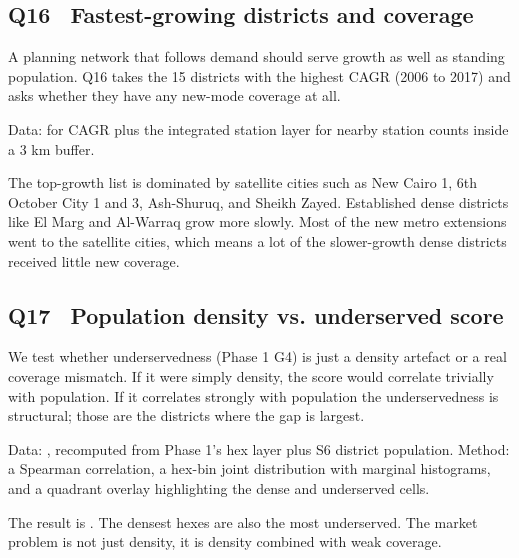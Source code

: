 \subsection{Q16 \textbullet\ Fastest-growing districts and coverage}

A planning network that follows demand should serve growth as well as
standing population. Q16 takes the 15 districts with the highest CAGR
(2006 to 2017) and asks whether they have any new-mode coverage at
all.

Data:  for CAGR plus the integrated station
layer for nearby station counts inside a 3 km buffer.


The top-growth list is dominated by satellite cities such as New Cairo
1, 6th October City 1 and 3, Ash-Shuruq, and Sheikh Zayed. Established
dense districts like El Marg and Al-Warraq grow more slowly. Most of
the new metro extensions went to the satellite cities, which means a
lot of the slower-growth dense districts received little new coverage.

\subsection{Q17 \textbullet\ Population density vs. underserved score}

We test whether underservedness (Phase 1 G4) is just a density artefact
or a real coverage mismatch. If it were simply density, the score
would correlate trivially with population. If it correlates strongly
with population the underservedness is structural; those are the
districts where the gap is largest.

Data: , recomputed from Phase 1's
hex layer plus S6 district population. Method: a Spearman correlation,
a hex-bin joint distribution with marginal histograms, and a quadrant
overlay highlighting the dense and underserved cells.


The result is . The densest hexes
are also the most underserved. The market problem is not just density,
it is density combined with weak coverage.

